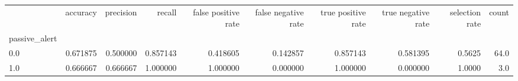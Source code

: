 \begin{tabular}{lrrrrrrrrr}
\toprule
{} &  accuracy &  precision &    recall &  false positive rate &  false negative rate &  true positive rate &  true negative rate &  selection rate &  count \\
passive\_alert &           &            &           &                      &                      &                     &                     &                 &        \\
\midrule
0.0           &  0.671875 &   0.500000 &  0.857143 &             0.418605 &             0.142857 &            0.857143 &            0.581395 &          0.5625 &   64.0 \\
1.0           &  0.666667 &   0.666667 &  1.000000 &             1.000000 &             0.000000 &            1.000000 &            0.000000 &          1.0000 &    3.0 \\
\bottomrule
\end{tabular}
